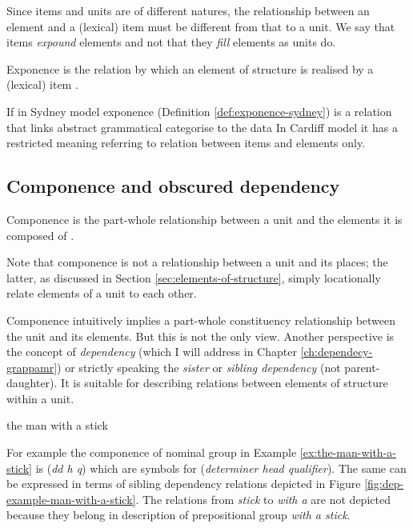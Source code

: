 Since items and units are of different natures, the relationship between an element and a (lexical) item must be different from that to a unit. We say that items \textit{expound} elements and not that they \textit{fill} elements as units do. 

\begin{definition}\label{def:exponence}
    Exponence is the relation by which an element of structure is realised by a (lexical) item \citep[254]{Fawcett2000}. 
\end{definition}

If in Sydney model exponence (Definition \ref{def:exponence-sydney}) is a relation that links abstract grammatical categorise to the data In Cardiff model it has a restricted meaning referring to relation between items and elements only. 

\subsection{Componence and obscured dependency}
\label{sec:componence}
\begin{definition}[Componence]\label{def:componence}
    Componence is the part-whole relationship between a unit and the elements it is composed of \citep[244]{Fawcett2000}. 
\end{definition}

Note that componence is not a relationship between a unit and its places; the latter, as discussed in Section \ref{sec:elements-of-structure}, simply locationally relate elements of a unit to each other.

Componence intuitively implies a part-whole constituency relationship between the unit and its elements. But this is not the only view. Another perspective is the concept of \textit{dependency} (which I will address in Chapter \ref{ch:dependecy-grappamr}) or strictly speaking the \textit{sister} or \textit{sibling dependency} (not parent-daughter). 
It is suitable for describing relations between elements of structure within a unit. 

\begin{exe}
    \ex\label{ex:the-man-with-a-stick} the man with a stick
\end{exe}

For example the componence of nominal group in Example \ref{ex:the-man-with-a-stick} is (\textit{dd h q}) which are symbols for (\textit{determiner head qualifier}). The same can be expressed in terms of sibling dependency relations depicted in Figure \ref{fig:dep-example-man-with-a-stick}. The relations from \textit{stick} to \textit{with a} are not depicted because they belong in description of prepositional group \textit{with a stick}.

